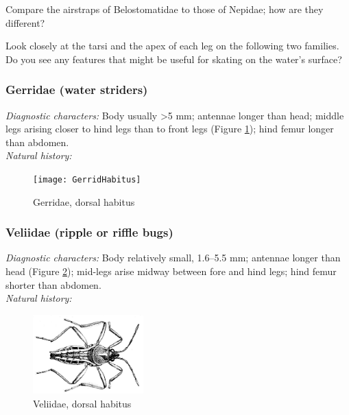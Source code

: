 \documentclass[letterpaper, 11pt]{article}
\begin{document}
\noindent{}Compare the airstraps of Belostomatidae to those of Nepidae; how are they different?

\noindent{}Look closely at the tarsi and the apex of each leg on the following two families. Do you see any features that might be useful for skating on the water's surface?

\subsubsection{Gerridae (water striders)}
\noindent{}\textit{Diagnostic characters:} Body usually \textgreater5 mm; antennae longer than head; middle legs arising closer to hind legs than to front legs (Figure \ref{fig:gerrid1}); hind femur longer than abdomen.\\

\noindent{}\textit{Natural history:} \\

\begin{figure}[ht!]
 \centering
 \texttt{[image: GerridHabitus]}
 \caption{Gerridae, dorsal habitus \citep[][Plate 7, Fig. 12]{bhl37902}}
 \label{fig:gerrid1}
\end{figure}

\subsubsection{Veliidae (ripple or riffle bugs)}
\noindent{}\textit{Diagnostic characters:} Body relatively small, 1.6--5.5 mm; antennae longer than head (Figure \ref{fig:veliid1}); mid-legs arise midway between fore and hind legs; hind femur shorter than abdomen.\\

\noindent{}\textit{Natural history:} \\

\begin{figure}[ht!]
 \centering
 \includegraphics[width=0.38\textwidth]{VeliidHabitus}
 \caption{Veliidae, dorsal habitus \citep[][Plate 7, Fig. 11]{bhl37902}}
 \label{fig:veliid1}
\end{figure}
\end{document}
